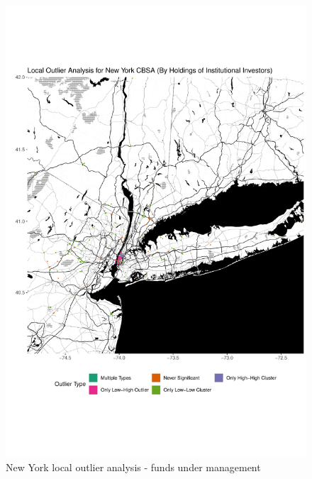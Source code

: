 \begin{figure}
	\centering
	\includegraphics[width=1\linewidth]{Figures/ChapterIV/NY_Money_LO}
	\caption[New York CBSA Local Outlier Analysis - Funds Under Management 2013-2018]{New York local outlier analysis - funds under management}
	\label{fig:NYClocaloutlier}
\end{figure}

